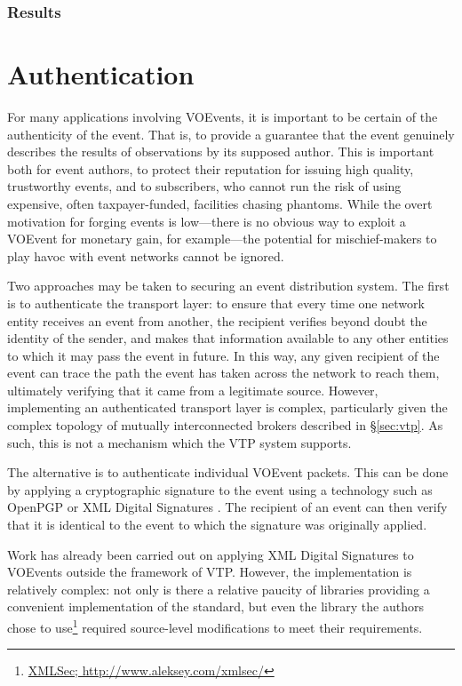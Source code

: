 \documentclass[5p,authoryear]{elsarticle}
\begin{document}
\subsubsection{Results}

\section{Authentication}
\label{sec:security}

For many applications involving VOEvents, it is important to be certain of the
authenticity of the event. That is, to provide a guarantee that the event
genuinely describes the results of observations by its supposed author. This
is important both for event authors, to protect their reputation for issuing
high quality, trustworthy events, and to subscribers, who cannot run the risk
of using expensive, often taxpayer-funded, facilities chasing phantoms. While
the overt motivation for forging events is low---there is no obvious way to
exploit a VOEvent for monetary gain, for example---the potential for
mischief-makers to play havoc with event networks cannot be ignored.

Two approaches may be taken to securing an event distribution system. The
first is to authenticate the transport layer: to ensure that every time one
network entity receives an event from another, the recipient verifies beyond
doubt the identity of the sender, and makes that information available to any
other entities to which it may pass the event in future. In this way, any
given recipient of the event can trace the path the event has taken across the
network to reach them, ultimately verifying that it came from a legitimate
source.  However, implementing an authenticated transport layer is complex,
particularly given the complex topology of mutually interconnected brokers
described in \S\ref{sec:vtp}. As such, this is not a mechanism which the VTP
system supports.

The alternative is to authenticate individual VOEvent packets. This can be
done by applying a cryptographic signature to the event using a technology
such as OpenPGP \citep{Callas:2007} or XML Digital Signatures
\citep{Bartel:2008}. The recipient of an event can then verify that it is
identical to the event to which the signature was originally applied.

Work has already been carried out on applying XML Digital Signatures to
VOEvents \citep{Allen:2008} outside the framework of VTP. However, the
implementation is relatively complex: not only is there a relative paucity of
libraries providing a convenient implementation of the standard, but even the
library the authors chose to use\footnote{\url{XMLSec;
http://www.aleksey.com/xmlsec/}} required source-level modifications to meet
their requirements.
\end{document}
